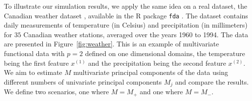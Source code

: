 \documentclass{article}
\newcounter{rem}
\newcounter{th}
\newcounter{scenario}[section]
\begin{document}
To illustrate our simulation results, we apply the same idea on a real dataset, the Canadian weather dataset \citep{ramsayFunctionalDataAnalysis2005}, available in the \textsf{R} package \texttt{fda} \citep{ramsayFdaFunctionalData2023}. The dataset contains daily measurements of temperature (in Celsius) and precipitation (in millimeters) for $35$ Canadian weather stations, averaged over the years 1960 to 1994. The data are presented in Figure~\ref{fig:weather}. This is an example of multivariate functional data with $p = 2$ defined on one dimensional domains, the temperature being the first feature $x^{(1)}$ and the precipitation being the second feature $x^{(2)}$. We aim to estimate $M$ multivariate principal components of the data using different numbers of univariate principal components $M_j$ and compare the results. We define two scenarios, one where $M = M_{+}$ and one where $M = M_{-}$.
\end{document}
